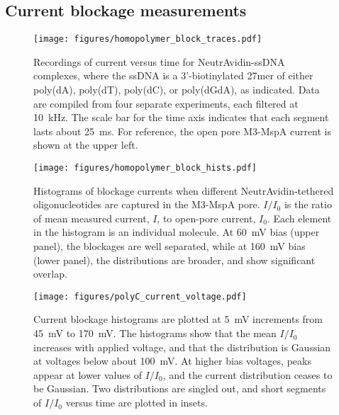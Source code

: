 \subsection{Current blockage measurements}

\begin{figure}[h]
\begin{centering}
\texttt{[image: figures/homopolymer\_block\_traces.pdf]}
\caption[Current blockage traces for homopolymer ssDNA]{Recordings of current versus time for NeutrAvidin-ssDNA complexes, where the ssDNA is a 3'-biotinylated 27mer of either poly(dA), poly(dT), poly(dC), or poly(dGdA), as indicated.  Data are compiled from four separate experiments, each filtered at \SI{10}{\kHz}.  The scale bar for the time axis indicates that each segment lasts about \SI{25}{\ms}.  For reference, the open pore M3-MspA current is shown at the upper left.}
\label{fig:homopolymer_blockages}
\end{centering}
\end{figure}

\begin{figure}[h]
\begin{centering}
\texttt{[image: figures/homopolymer\_block\_hists.pdf]}
\caption[Current blockage histograms for homopolymer ssDNA]{Histograms of blockage currents when different NeutrAvidin-tethered oligonucleotides are captured in the M3-MspA pore.  $I/I_0$ is the ratio of mean measured current, $I$, to open-pore current, $I_0$.  Each element in the histogram is an individual molecule.  At \SI{60}{\mV} bias (upper panel), the blockages are well separated, while at \SI{160}{\mV} bias (lower panel), the distributions are broader, and show significant overlap.}
\label{fig:homopolymer_blockage_hists}
\end{centering}
\end{figure}

\begin{figure}[h]
\begin{centering}
\texttt{[image: figures/polyC\_current\_voltage.pdf]}
\caption[Current histograms for poly(dC) ssDNA versus voltage]{Current blockage histograms are plotted at \SI{5}{\mV} increments from \SI{45}{\mV} to \SI{170}{\mV}.  The histograms show that the mean $I/I_0$ increases with applied voltage, and that the distribution is Gaussian at voltages below about \SI{100}{\mV}.  At higher bias voltages, peaks appear at lower values of $I/I_0$, and the current distribution ceases to be Gaussian.  Two distributions are singled out, and short segments of $I/I_0$ versus time are plotted in insets.}
\label{fig:polyC_hists}
\end{centering}
\end{figure}


